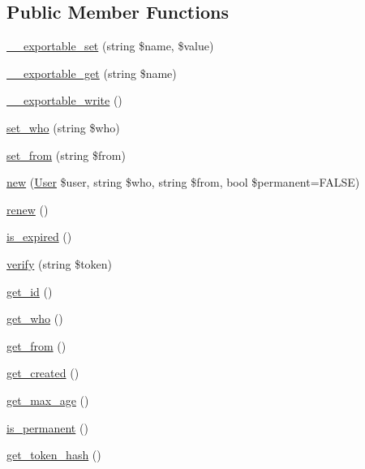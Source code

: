 \subsection*{Public Member Functions}
\begin{DoxyCompactItemize}
\item 
\hyperlink{classlibresignage_1_1common_1_1php_1_1auth_1_1Session_a15d1f73fa97e7ad612f62030a082e2ee}{\+\_\+\+\_\+exportable\+\_\+set} (string \$name, \$value)
\item 
\hyperlink{classlibresignage_1_1common_1_1php_1_1auth_1_1Session_afaa73175f57bc82eaa11cdc7523b7a0e}{\+\_\+\+\_\+exportable\+\_\+get} (string \$name)
\item 
\hyperlink{classlibresignage_1_1common_1_1php_1_1auth_1_1Session_a95739c917347086b583c1e9d8d5e51e1}{\+\_\+\+\_\+exportable\+\_\+write} ()
\item 
\hyperlink{classlibresignage_1_1common_1_1php_1_1auth_1_1Session_aea393157c40941ef78ec2472ccdee9eb}{set\+\_\+who} (string \$who)
\item 
\hyperlink{classlibresignage_1_1common_1_1php_1_1auth_1_1Session_a3a6113a35af8eeeab6fa26a514ccdbed}{set\+\_\+from} (string \$from)
\item 
\hyperlink{classlibresignage_1_1common_1_1php_1_1auth_1_1Session_afe64254ed36226f20232e29dd884f59e}{new} (\hyperlink{classlibresignage_1_1common_1_1php_1_1auth_1_1User}{User} \$user, string \$who, string \$from, bool \$permanent=F\+A\+L\+SE)
\item 
\hyperlink{classlibresignage_1_1common_1_1php_1_1auth_1_1Session_af3598977832db386e7017a32cb02f09f}{renew} ()
\item 
\hyperlink{classlibresignage_1_1common_1_1php_1_1auth_1_1Session_af86f3700fd81fdcc2bdeb4dd8ec3a64f}{is\+\_\+expired} ()
\item 
\hyperlink{classlibresignage_1_1common_1_1php_1_1auth_1_1Session_a781ed179ca0695c73e9bbf249695b86f}{verify} (string \$token)
\item 
\hyperlink{classlibresignage_1_1common_1_1php_1_1auth_1_1Session_a02e17384c6c2f6d9c20141ebcb7d0322}{get\+\_\+id} ()
\item 
\hyperlink{classlibresignage_1_1common_1_1php_1_1auth_1_1Session_a670b6fbef5dc2487821f6d3631366985}{get\+\_\+who} ()
\item 
\hyperlink{classlibresignage_1_1common_1_1php_1_1auth_1_1Session_af2c56f2c1d34b1079cdfe50571b1369c}{get\+\_\+from} ()
\item 
\hyperlink{classlibresignage_1_1common_1_1php_1_1auth_1_1Session_a5804c1de72f2bda13fdc49091a55e4bc}{get\+\_\+created} ()
\item 
\hyperlink{classlibresignage_1_1common_1_1php_1_1auth_1_1Session_ae5667195d6c0d42c76a39da30e9fba17}{get\+\_\+max\+\_\+age} ()
\item 
\hyperlink{classlibresignage_1_1common_1_1php_1_1auth_1_1Session_aa5b3b169be03446981263193673eee39}{is\+\_\+permanent} ()
\item 
\hyperlink{classlibresignage_1_1common_1_1php_1_1auth_1_1Session_a5f5d9d630195a990df4d0b40b3e5957a}{get\+\_\+token\+\_\+hash} ()
\end{DoxyCompactItemize}
